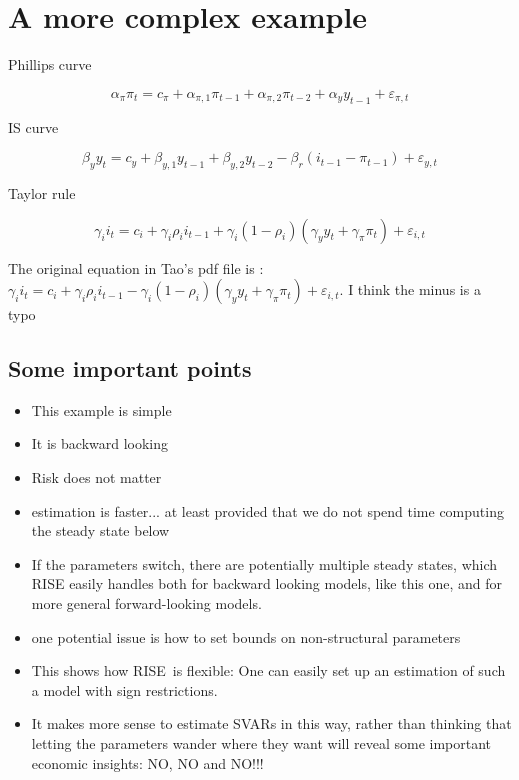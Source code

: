 \documentclass{article}
\begin{document}
\section{A more complex example}

Phillips curve

\[
\alpha _{\pi }\pi _{t}=c_{\pi }+\alpha _{\pi ,1}\pi _{t-1}+\alpha _{\pi
,2}\pi _{t-2}+\alpha _{y}y_{t-1}+\varepsilon _{\pi ,t}
\]

IS curve

\[
\beta _{y}y_{t}=c_{y}+\beta _{y,1}y_{t-1}+\beta _{y,2}y_{t-2}-\beta
_{r}\left( i_{t-1}-\pi _{t-1}\right) +\varepsilon _{y,t}
\]

Taylor rule

\[
\gamma _{i}i_{t}=c_{i}+\gamma _{i}\rho _{i}i_{t-1}+\gamma _{i}\left( 1-\rho
_{i}\right) \left( \gamma _{y}y_{t}+\gamma _{\pi }\pi _{t}\right)
+\varepsilon _{i,t}
\]

The original equation in Tao's pdf file is : $\gamma _{i}i_{t}=c_{i}+\gamma
_{i}\rho _{i}i_{t-1}-\gamma _{i}\left( 1-\rho _{i}\right) \left( \gamma
_{y}y_{t}+\gamma _{\pi }\pi _{t}\right) +\varepsilon _{i,t}$. I think the
minus is a typo

\subsection{Some important points}

\begin{itemize}
\item This example is simple

\item It is backward looking

\item Risk does not matter

\item estimation is faster... at least provided that we do not spend time
computing the steady state below

\item If the parameters switch, there are potentially multiple steady
states, which RISE easily handles both for backward looking models, like
this one, and for more general forward-looking models.

\item one potential issue is how to set bounds on non-structural parameters

\item This shows how RISE\ is flexible: One can easily set up an estimation
of such a model with sign restrictions.

\item It makes more sense to estimate SVARs in this way, rather than
thinking that letting the parameters wander where they want will reveal some
important economic insights: NO, NO and NO!!!
\end{itemize}
\end{document}
